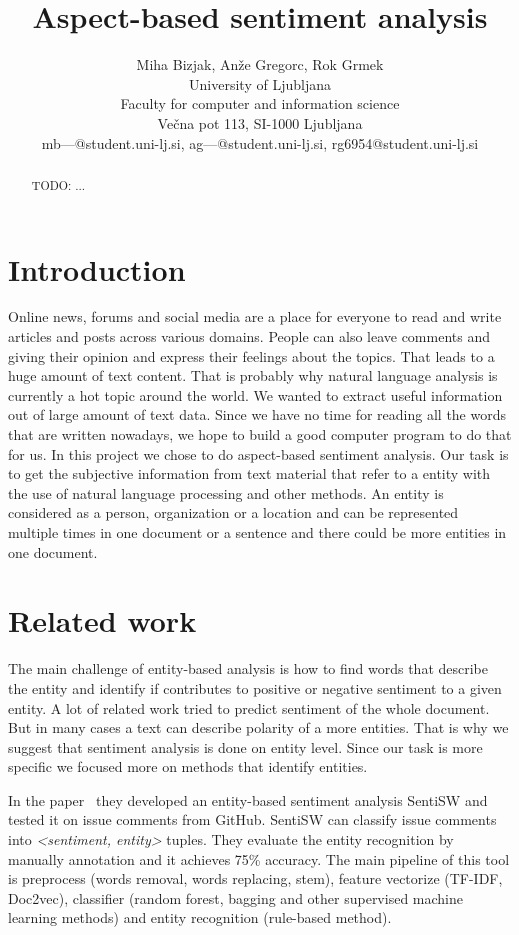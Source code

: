 \documentclass[11pt,a4paper]{article}
\title{Aspect-based sentiment analysis}
\author{
    Miha Bizjak, Anže Gregorc, Rok Grmek \\
    University of Ljubljana \\
    Faculty for computer and information science \\
    Večna pot 113, SI-1000 Ljubljana \\
    mb---@student.uni-lj.si, ag---@student.uni-lj.si, rg6954@student.uni-lj.si
}
\date{}
\begin{document}
\maketitle



\begin{abstract}
    TODO: ...
\end{abstract}



\section{Introduction}

Online news, forums and social media are a place for everyone to read and write articles and posts across various domains. 
People can also leave comments and giving their opinion and express their feelings about the topics. 
That leads  to a huge amount of text content. 
That is probably why natural language analysis is currently a hot topic around the world.
We wanted to extract useful information out of large amount of text data. Since we have no time for reading all the words that are written nowadays, we hope to build a good computer program to do that for us.
In this project we chose to do aspect-based sentiment analysis. 
Our task is to get the subjective information from text material that refer to a entity with the use of natural language processing and other methods. 
An entity is considered as a person, organization or a location and can be represented multiple times in one document or a sentence and there could be more entities in one document.



\section{Related work}

The main challenge of entity-based analysis is how to find words that describe the entity and identify if contributes to positive or negative sentiment to a given entity. 
A lot of related work tried to predict sentiment of the whole document. 
But in many cases a text can describe polarity of a more entities. 
That is why we suggest that sentiment analysis is done on entity level.
Since our task is more specific we focused more on methods that identify entities.

In the paper~\cite{ding2018entity} they developed an entity-based sentiment analysis SentiSW and tested it on issue comments from GitHub.
SentiSW can classify issue comments into \emph{<sentiment, entity>} tuples. 
They evaluate the entity recognition by manually annotation and it achieves 75\% accuracy. 
The main pipeline of this tool is preprocess (words removal, words replacing, stem), feature vectorize (TF-IDF, Doc2vec), classifier (random forest, bagging and other supervised machine learning methods) and entity recognition (rule-based method). 
\end{document}
